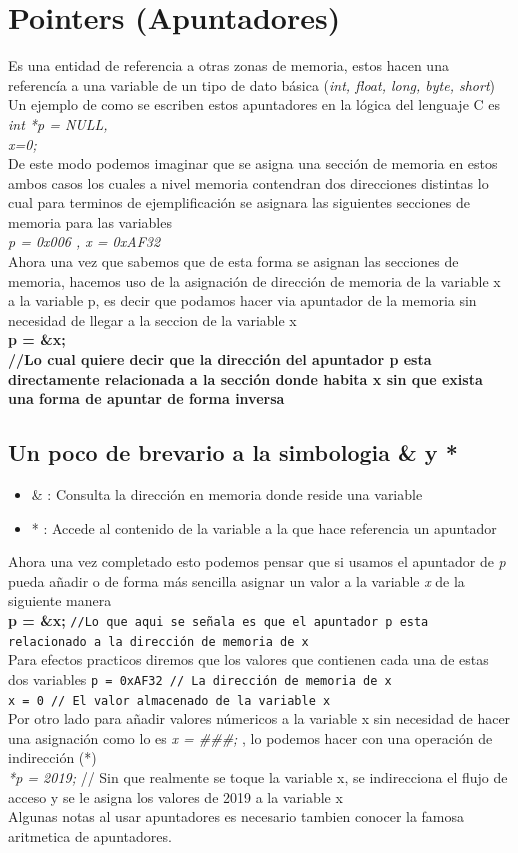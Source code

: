 \documentclass[10pt,executivepaper]{article}
\newcommand\tab[1][1cm]{\hspace*{#1}}
\begin{document}
\section{Pointers (Apuntadores)}
Es una entidad de referencia a otras zonas de memoria, estos hacen una referencía a una variable de un tipo de dato básica (\textit{int, float, long, byte, short})
\\
Un ejemplo de como se escriben estos apuntadores en la lógica del lenguaje C es\\
\tab \textit{int *p = NULL, \\\tab x=0;}\\
De este modo podemos imaginar que se asigna una sección de memoria en estos ambos casos los cuales a nivel memoria contendran dos direcciones distintas lo cual para terminos de ejemplificación se asignara las siguientes secciones de memoria para las variables\\
\tab \emph{p = 0x006 , x = 0xAF32}\\
Ahora una vez que sabemos que de esta forma se asignan las secciones de memoria, hacemos uso de la asignación de dirección de memoria de la variable x a la variable p, es decir que podamos hacer via apuntador de la memoria sin necesidad de llegar a la seccion de la variable x\\
\tab \textbf{p = \&x; \\//Lo cual quiere decir que la dirección del apuntador p esta directamente relacionada a la sección donde habita x sin que exista una forma de apuntar de forma inversa}
\subsection{Un poco de brevario a la simbologia \& y *}
\begin{itemize}
\item \& : Consulta la dirección en memoria donde reside una variable
\item * : Accede al contenido de la variable a la que hace referencia un apuntador
\end{itemize}
Ahora una vez completado esto podemos pensar que si usamos el apuntador de \textit{p} pueda añadir o de forma más sencilla asignar un valor a la variable \textit{x} de la siguiente manera\\
\tab \textbf{p = \&x; } \texttt{//Lo que aqui se señala es que el apuntador p esta relacionado a la dirección de memoria de x}\\
Para efectos practicos diremos que los valores que contienen cada una de estas dos variables \texttt{p = 0xAF32 // La dirección de memoria de x\\ x = 0 // El valor almacenado de la variable x}\\
Por otro lado para añadir valores númericos a la variable x sin necesidad de hacer una asignación como lo es \textit{x = \#\#\#;} , lo podemos hacer con una operación de indirección (*)\\ \textit{*p = 2019; }// Sin que realmente se toque la variable x, se indirecciona el flujo de acceso y se le asigna los valores de 2019 a la variable x\\
Algunas notas al usar apuntadores es necesario tambien conocer la famosa aritmetica de apuntadores.
\end{document}
